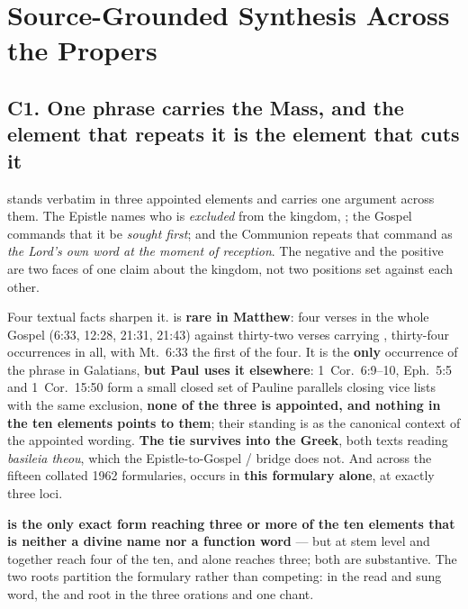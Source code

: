 \sectionguard
\section*{Source-Grounded Synthesis Across the Propers}

\subsection*{C1. One phrase carries the Mass, and the element that repeats it is the element that cuts it}

 stands verbatim in three appointed elements and carries one
argument across them. The Epistle names who is \emph{excluded} from the
kingdom, ; the Gospel
commands that it be \emph{sought first}; and the Communion repeats that command
as \emph{the Lord's own word at the moment of reception}. The negative and the
positive are two faces of one claim about the kingdom, not two positions set
against each other.

Four textual facts sharpen it.  is \textbf{rare in Matthew}:
four verses in the whole Gospel (6:33, 12:28, 21:31, 21:43) against
thirty-two verses carrying , thirty-four occurrences in
all, with Mt.\ 6:33 the first of the four. It is
the \textbf{only} occurrence of the phrase in Galatians, \textbf{but Paul uses
it elsewhere}: 1~Cor.~6:9--10, Eph.~5:5 and
1~Cor.~15:50 form a small closed set of Pauline parallels closing vice lists
with the same exclusion, \textbf{none of the three is appointed, and nothing in
the ten elements points to them}; their standing is as the canonical context of
the appointed wording. \textbf{The tie survives into the Greek}, both texts
reading \emph{basileia theou}, which the Epistle-to-Gospel  /
 bridge does not. And across the fifteen collated 1962 formularies,
 occurs in
\textbf{this formulary alone}, at exactly three loci.

\textbf{ is the only exact form reaching three or more of the
ten elements that is neither a divine name nor a function word} --- but at stem
level  and  together reach four of the ten, and
 alone reaches three; both are substantive. The two roots
partition the formulary rather than competing:  in the read and
sung word, the  and  root in the three orations and
one chant.

